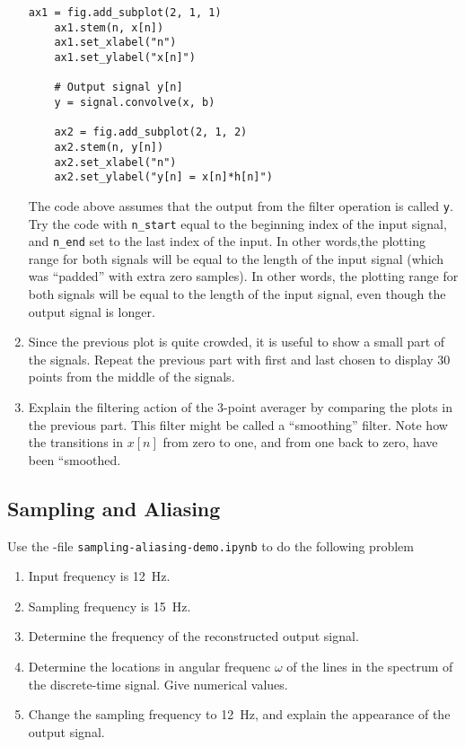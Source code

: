 \begin{enumerate}[1)]
\begin{lstlisting}[style=pythonstyle]
	ax1 = fig.add_subplot(2, 1, 1)
	ax1.stem(n, x[n])
	ax1.set_xlabel("n")
	ax1.set_ylabel("x[n]")
	
	# Output signal y[n]
	y = signal.convolve(x, b)
	
	ax2 = fig.add_subplot(2, 1, 2)
	ax2.stem(n, y[n])
	ax2.set_xlabel("n")
	ax2.set_ylabel("y[n] = x[n]*h[n]")
	\end{lstlisting}
	The code above assumes that the output from the filter operation is called \verb|y|.
	Try the code with \verb|n_start| equal to the beginning index of the input signal, and \verb|n_end| set to  the last index of the input. In other words,the plotting range for both signals will be equal to the length of the input signal (which was “padded” with extra zero samples).
	In other words, the plotting range for both signals will be equal to the length of the input signal, even though
	the output signal is longer.
	
	\item Since the previous plot is quite crowded, it is useful to show a small part of the signals. Repeat the
	previous part with first and last chosen to display 30 points from the middle of the signals.
	
	\item Explain the filtering action of the 3-point averager by comparing the plots in the previous part. This
	filter might be called a “smoothing” filter. Note how the transitions in $x[n]$ from zero to one, and from
	one back to zero, have been “smoothed.
	
\end{enumerate}

\subsection{Sampling and Aliasing}
Use the \jupyterlab-file \verb|sampling-aliasing-demo.ipynb| to do the following problem
\begin{enumerate}[1)]
	\item Input frequency is \qty{12}{Hz}.
	\item Sampling frequency is \qty{15}{Hz}.
	\item Determine the frequency of the reconstructed output signal.
	\item Determine the locations in angular frequenc $\omega$ of the lines in the spectrum of the discrete-time signal. Give numerical values.
	\item Change the sampling frequency to \qty{12}{Hz}, and explain the appearance of the output signal.
	
\end{enumerate}

